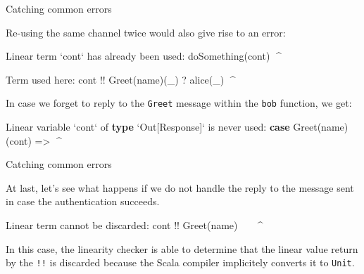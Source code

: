 \documentclass[ignorenonframetext,]{beamer}
\newenvironment{Shaded}{}{}
\newcommand{\FunctionTok}[1]{\textcolor[rgb]{0.02,0.16,0.49}{#1}}
\newcommand{\KeywordTok}[1]{\textcolor[rgb]{0.00,0.44,0.13}{\textbf{#1}}}
\newcommand{\NormalTok}[1]{#1}
\begin{document}
\begin{frame}[fragile]{%
\protect\hypertarget{catching-common-errors-1}{%
Catching common errors}}

Re-using the same channel twice would also give rise to an error:

\begin{Shaded}
\begin{Highlighting}[]
\NormalTok{Linear term `cont` has already been used:}
    \FunctionTok{doSomething}\NormalTok{(cont)}
\NormalTok{                ^^^^}

\NormalTok{Term used here:}
\NormalTok{    cont !! }\FunctionTok{Greet}\NormalTok{(name)(_) ? }\FunctionTok{alice}\NormalTok{(_)}
\NormalTok{    ^^^^}
\end{Highlighting}
\end{Shaded}

In case we forget to reply to the \texttt{Greet} message within the
\texttt{bob} function, we get:

\begin{Shaded}
\begin{Highlighting}[]
\NormalTok{Linear variable `cont` of }\KeywordTok{type}\NormalTok{ `Out[Response]` is never used:}
    \KeywordTok{case} \FunctionTok{Greet}\NormalTok{(name)(cont) =>}
\NormalTok{                     ^^^^}
\end{Highlighting}
\end{Shaded}

\end{frame}

\begin{frame}[fragile]{%
\protect\hypertarget{catching-common-errors-2}{%
Catching common errors}}

At last, let’s see what happens if we do not handle the reply to the
 message sent in case the authentication succeeds.

\begin{Shaded}
\begin{Highlighting}[]
\NormalTok{Linear term cannot be discarded:}
\NormalTok{    cont !! }\FunctionTok{Greet}\NormalTok{(name)}
\NormalTok{    ^^^^^^^^^^^^^^^^^^^}
\end{Highlighting}
\end{Shaded}

In this case, the linearity checker is able to determine that the linear
value return by the \texttt{!!} is discarded because the Scala compiler
implicitely converts it to \texttt{Unit}.

\end{frame}
\end{document}
